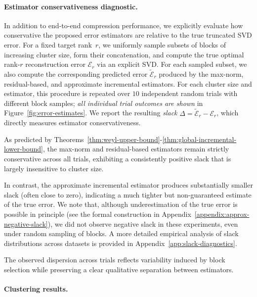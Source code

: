 \documentclass[10pt]{article} %
\begin{document}
\paragraph{Estimator conservativeness diagnostic.}
In addition to end-to-end compression performance, we explicitly evaluate how conservative the proposed error estimators are relative to the true truncated SVD error.
For a fixed target rank~$r$, we uniformly sample subsets of blocks of increasing cluster size, form their concatenation, and compute the true optimal rank-$r$ reconstruction error $\mathcal E_r$ via an explicit SVD.
For each sampled subset, we also compute the corresponding predicted error $\tilde{\mathcal E}_r$ produced by the max-norm, residual-based, and approximate incremental estimators.
For each cluster size and estimator, this procedure is repeated over $10$ independent random trials with different block samples; \emph{all individual trial outcomes are shown} in Figure~\ref{fig:error-estimates}.
We report the resulting \emph{slack} $\Delta = \tilde{\mathcal E}_r - \mathcal E_r$, which directly measures estimator conservativeness.

As predicted by Theorems~\ref{thm:weyl-upper-bound}-\ref{thm:global-incremental-lower-bound}, the max-norm and residual-based estimators remain strictly conservative across all trials, exhibiting a consistently positive slack that is largely insensitive to cluster size.

In contrast, the approximate incremental estimator produces substantially smaller slack (often close to zero), indicating a much tighter but non-guaranteed estimate of the true error. We note that, although underestimation of the true error is possible in principle (see the formal construction in Appendix~\ref{appendix:approx-negative-slack}), we did not observe negative slack in these experiments, even under random sampling of blocks. A more detailed empirical analysis of slack distributions across datasets is provided in Appendix~\ref{app:slack-diagnostics}.

The observed dispersion across trials reflects variability induced by block selection while preserving a clear qualitative separation between estimators.

\paragraph{Clustering results.}
\end{document}
